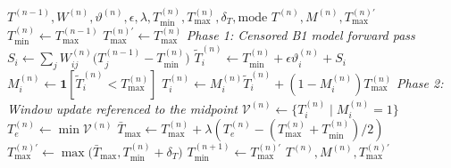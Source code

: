 \documentclass[12pt]{article}
\providecommand{\DIFaddtex}[1]{{\protect\color{blue}\sf #1}}
\providecommand{\DIFadd}[1]{\texorpdfstring{\DIFaddtex{#1}}{#1}}
\providecommand{\DIFaddbegin}{}
\providecommand{\DIFaddend}{}
\begin{document}
\begin{algorithm}[H]
\caption{Forward  \DIFaddbegin \DIFadd{pass }\DIFaddend and  \DIFaddbegin \DIFadd{adaptive temporal window update.}\DIFaddend }
\label{alg:atsnn_update}
\begin{algorithmic}[1]
 \Require  \DIFaddbegin \DIFadd{$T^{(n-1)},W^{(n)},\vartheta^{(n)},\epsilon,\lambda,T_{\min}^{(n)},T_{\max}^{(n)},\delta_T,\mathrm{mode}$
}\DIFaddend \Ensure  \DIFaddbegin \DIFadd{$T^{(n)},M^{(n)},T_{\max}^{(n)\prime}$
}\DIFaddend \State  \DIFaddbegin \DIFadd{$T_{\min}^{(n)}\gets T_{\max}^{(n-1)}$ }
\State \DIFadd{$T_{\max}^{(n)\prime}\gets T_{\max}^{(n)}$ }
    \DIFaddend \Statex \textit{Phase 1:  \DIFaddbegin \DIFadd{Censored B1 model }\DIFaddend forward pass}
     \State  \DIFaddbegin \DIFadd{$S_i\gets\sum_j W_{ij}^{(n)}\bigl(T_j^{(n-1)}-T_{\min}^{(n)}\bigr)$
    }\DIFaddend \State  \DIFaddbegin \DIFadd{$\tilde{T}_i^{(n)}\gets T_{\min}^{(n)}+\epsilon\vartheta_i^{(n)}+S_i$
    }\DIFaddend \State  \DIFaddbegin \DIFadd{$M_i^{(n)}\gets\mathbf{1}[\tilde{T}_i^{(n)}<T_{\max}^{(n)}]$
    }\State \DIFadd{$T_i^{(n)}\gets M_i^{(n)}\tilde{T}_i^{(n)}+(1-M_i^{(n)})T_{\max}^{(n)}$
}\DIFaddend \EndFor
     \Statex \textit{Phase 2:  \DIFaddbegin \DIFadd{Window }\DIFaddend update \DIFaddbegin \DIFadd{referenced to the midpoint}\DIFaddend }
 \DIFaddbegin {}
    \DIFaddend \State  \DIFaddbegin \DIFadd{$\mathcal{V}^{(n)}\gets\{T_i^{(n)}\mid M_i^{(n)}=1\}$
    }
        \DIFaddend \State  \DIFaddbegin \DIFadd{$T_e^{(n)}\gets\min\mathcal{V}^{(n)}$
        }\DIFaddend \State  \DIFaddbegin \DIFadd{$\bar{T}_{\max}\gets T_{\max}^{(n)}+\lambda\left(T_e^{(n)}-(T_{\max}^{(n)}+T_{\min}^{(n)})/2\right)$
        }\DIFaddend \State  \DIFaddbegin \DIFadd{$T_{\max}^{(n)\prime}\gets\max\bigl(\bar{T}_{\max},T_{\min}^{(n)}+\delta_T\bigr)$
    }\DIFaddend \EndIf
 \DIFaddbegin \EndIf
\DIFaddend \State \DIFaddbegin \DIFadd{$T_{\min}^{(n+1)}\gets T_{\max}^{(n)\prime}$
}\State \DIFaddend \Return  \DIFaddbegin \DIFadd{$T^{(n)},M^{(n)},T_{\max}^{(n)\prime}$
}\DIFaddend \end{algorithmic}
\end{algorithm}
\end{document}
